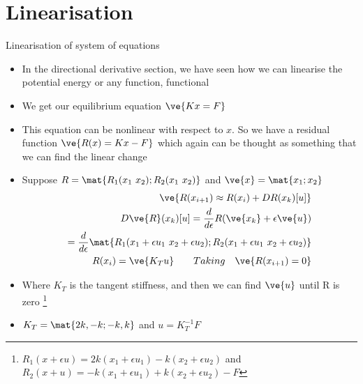
\section{Linearisation}

\begin{frame}{Linearisation of system of equations}
	\begin{itemize}
		\item  In the directional derivative section, we have seen how we can linearise the potential energy or any function, functional
		\item We get our equilibrium equation $\ve{Kx = F}$
		\item This equation can be nonlinear with respect to $x$. So we have a residual function  $\ve{R(x)= Kx - F}$ which again can be thought as something that we can find the linear change
	\end{itemize}
\end{frame}

\begin{frame}
	\begin{itemize}
		\item Suppose $R = \mat{{R_1(x_1~x_2)};R_2(x_1~x_2)}$ and $\ve{x} = \mat{x_1;x_2}$
		\begin{align*}
		\ve{R(x_{i+1}) \approx R(x_{i}) + D{R}{(x_k)}[u]} \\
		D{\ve{R} }{(x_k)}[u]  = \frac{d}{d \epsilon} R(\ve{x_k} + \epsilon \ve{u})\\
		= \frac{d}{d \epsilon}\mat{{R_1(x_1+ \epsilon u_1~x_2+   \epsilon u_2)};R_2(x_1+ \epsilon u_1~x_2+ \epsilon u_2)}\\
		R(x_{i})= \ve{K_Tu}  \qquad Taking \quad \ve{R(x_{i+1}) = 0}
		\end{align*}
		\item Where $K_T$ is the tangent stiffness, and then we can find $\ve{u}$ until R is zero \footnote{$R_1(x+\epsilon u) = 2k(x_1+\epsilon u_1) - k(x_2+\epsilon u_2)$ and $R_2(x+u) =-k(x_1+\epsilon u_1) + k(x_2+\epsilon u_2) - F$ }
		\item $K_T = \mat{2k,-k;-k,k}$ and $u = K_T^{-1}F$
		
	\end{itemize}
\end{frame}
